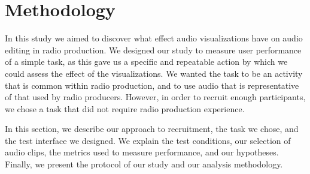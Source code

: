 




\section{Methodology}\label{sec:vis-method}

In this study we aimed to discover what effect audio visualizations have on audio editing in radio production.  We
designed our study to measure user performance of a simple task, as this gave us a specific and repeatable action by
which we could assess the effect of the visualizations.  We wanted the task to be an activity that is common within
radio production, and to use audio that is representative of that used by radio producers.  However, in order to
recruit enough participants, we chose a task that did not require radio production experience.

In this section, we describe our approach to recruitment, the task we chose, and the test interface we designed.  We
explain the test conditions, our selection of audio clips, the metrics used to measure performance, and our hypotheses.
Finally, we present the protocol of our study and our analysis methodology.

